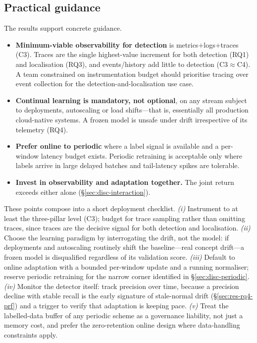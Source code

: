 \documentclass[acmsmall]{acmart}
\begin{document}
\subsection{Practical guidance}\label{sec:disc-guidance}

The results support concrete guidance.
\begin{itemize}
  \item \textbf{Minimum-viable observability for detection} is metrics${+}$logs${+}$traces (C3). Traces are the single highest-value increment for both detection (RQ1) and localisation (RQ3), and events/history add little to detection (C3$\approx$C4). A team constrained on instrumentation budget should prioritise tracing over event collection for the detection-and-localisation use case.
  \item \textbf{Continual learning is mandatory, not optional}, on any stream subject to deployments, autoscaling or load shifts---that is, essentially all production cloud-native systems. A frozen model is unsafe under drift irrespective of its telemetry (RQ4).
  \item \textbf{Prefer online to periodic} where a label signal is available and a per-window latency budget exists. Periodic retraining is acceptable only where labels arrive in large delayed batches and tail-latency spikes are tolerable.
  \item \textbf{Invest in observability and adaptation together.} The joint return exceeds either alone (\S\ref{sec:disc-interaction}).
\end{itemize}

These points compose into a short deployment checklist. \emph{(i)} Instrument to at least the three-pillar level (C3); budget for trace sampling rather than omitting traces, since traces are the decisive signal for both detection and localisation. \emph{(ii)} Choose the learning paradigm by interrogating the drift, not the model: if deployments and autoscaling routinely shift the baseline---real concept drift---a frozen model is disqualified regardless of its validation score. \emph{(iii)} Default to online adaptation with a bounded per-window update and a running normaliser; reserve periodic retraining for the narrow corner identified in \S\ref{sec:disc-periodic}. \emph{(iv)} Monitor the detector itself: track precision over time, because a precision decline with stable recall is the early signature of stale-normal drift (\S\ref{sec:res-rq4-prf}) and a trigger to verify that adaptation is keeping pace. \emph{(v)} Treat the labelled-data buffer of any periodic scheme as a governance liability, not just a memory cost, and prefer the zero-retention online design where data-handling constraints apply.
\end{document}
